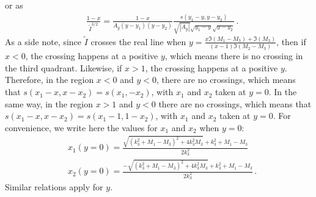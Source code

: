 \documentclass[twoside]{article}
\begin{document}
or as 
\begin{equation}
\begin{split}
&\frac{1-x}{\tilde{I}^{3/2}}=\frac{1-x}{A_y (y-y_1)(y-y_2)}\frac{s(y_1-y,y-y_2)}{\sqrt{|A_y|}\sqrt{y_1-y}\sqrt{y-y_2}}\,.
\end{split}
\end{equation}
As a side note, since $\tilde{I}$ crosses the real line when $y = \frac{x \Im(M_1-M_3)+\Im(M_3)}{(x-1) \Im(M_2-M_3)}$, then if $x<0$,
the crossing happens at a positive $y$, which means there is no crossing in the third quadrant. 
Likewise, if $x>1$, the crossing happens at a positive $y$. 
Therefore, in the region $x<0$ and $y<0$, there are no crossings, which means that $s(x_1-x,x-x_2) = s(x_1,-x_2)$, with $x_1$ and $x_2$ taken at $y=0$. 
In the same way, in the region $x>1$ and $y<0$ there are no crossings, which means that $s(x_1-x,x-x_2) = s(x_1-1,1-x_2)$, with $x_1$ and $x_2$ taken at $y=0$.
For convenience, we write here the values for $x_1$ and $x_2$ when $y=0$:
\begin{align}
&x_1(y=0) = \frac{\sqrt{(k_3^2 + M_1 - M_3)^2+4 k_3^2 M_3}+k_3^2 +M_1-M_3}{2 k_3^2}\\
&x_2(y=0) = \frac{-\sqrt{(k_3^2 + M_1 - M_3)^2+4 k_3^2 M_3}+k_3^2 +M_1-M_3}{2 k_3^2}\,.
\end{align} 
Similar relations apply for $y$.
\end{document}
